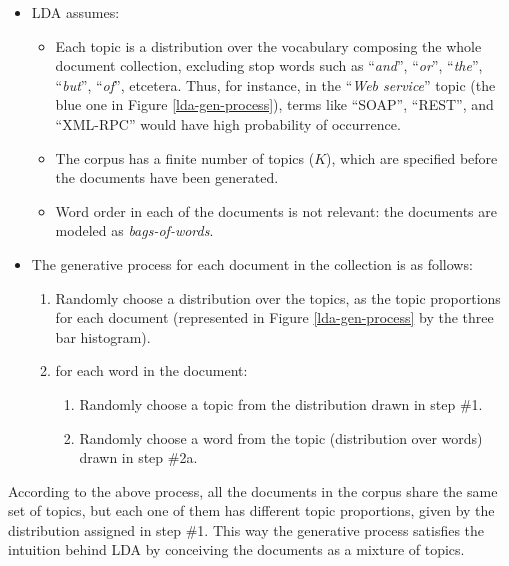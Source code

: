 \begin{itemize}
\item LDA assumes:

\begin{itemize}
\item Each topic is a distribution over the vocabulary composing the whole document collection, excluding stop words such as \textquotedblleft{}\emph{and}\textquotedblright{}, \textquotedblleft{}\emph{or}\textquotedblright{}, \textquotedblleft{}\emph{the}\textquotedblright{}, \textquotedblleft{}\emph{but}\textquotedblright{}, \textquotedblleft{}\emph{of}\textquotedblright{}, etcetera. Thus, for instance, in the ``\emph{Web service}'' topic (the blue one in Figure \ref{lda-gen-process}), terms like ``SOAP'', ``REST'', and ``XML-RPC'' would have high probability of occurrence. 
\item The corpus has a finite number of topics ($K$), which are specified before the documents have been generated. 
\item Word order in each of the documents is not relevant: the documents are modeled as \emph{bags-of-words}. 
\end{itemize}

\item The generative process for each document in the collection is as follows:

\begin{enumerate}
\item Randomly choose a distribution over the topics, as the topic proportions for each document (represented in Figure \ref{lda-gen-process} by the three bar histogram).
\item for each word in the document: 

\begin{enumerate}
\item Randomly choose a topic from the distribution drawn in step \#1. 
\item Randomly choose a word from the topic (distribution over words) drawn in step \#2a. 
\end{enumerate}
\end{enumerate}
\end{itemize}
According to the above process, all the documents in the corpus share the same set of topics, but each one of them has different topic proportions, given by the distribution assigned in step \#1. This way the generative process satisfies the intuition behind LDA by conceiving the documents as a mixture of topics.


